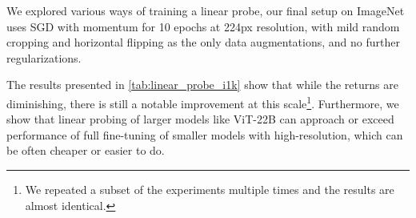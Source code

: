 \documentclass{article}
\newcommand{\chonk}{\mbox{ViT-22B}\xspace}
\begin{document}
We explored various ways of training a linear probe, our final setup on ImageNet uses SGD with momentum for 10 epochs at 224px resolution, with mild random cropping and horizontal flipping as the only data augmentations, and no further regularizations.



The results presented in \cref{tab:linear_probe_i1k} show that while the returns are diminishing, there is still a notable improvement at this scale\footnote{We repeated a subset of the experiments multiple times and the results are almost identical.}.
Furthermore, we show that linear probing of larger models like \chonk can approach or exceed performance of full fine-tuning of smaller models with high-resolution, which can be often cheaper or easier to do.


\begin{table}[ht]
    \caption{Linear evaluation on ImageNet-1k~\citep{deng2009imagenet} with varying scale. All models pre-trained on large datasets. 
    Performances of a few high-resolution fine-tuned models from are provided for reference.}
    \centering
    \setlength{\tabcolsep}{4pt}
\label{tab:linear_probe_i1k}
\end{table}
\end{document}
